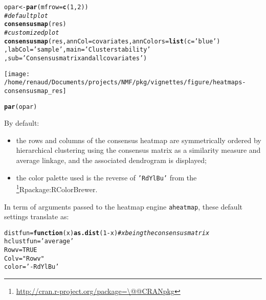 \documentclass[a4paper]{article}\usepackage[]{graphicx}\usepackage[]{color}
\makeatletter
\def\maxwidth{ %
  \ifdim\Gin@nat@width>\linewidth
    \linewidth
  \else
    \Gin@nat@width
  \fi
}
\newcommand{\hlnum}[1]{\textcolor[rgb]{0.686,0.059,0.569}{#1}}%
\newcommand{\hlstr}[1]{\textcolor[rgb]{0.192,0.494,0.8}{#1}}%
\newcommand{\hlcom}[1]{\textcolor[rgb]{0.678,0.584,0.686}{\textit{#1}}}%
\newcommand{\hlopt}[1]{\textcolor[rgb]{0,0,0}{#1}}%
\newcommand{\hlstd}[1]{\textcolor[rgb]{0.345,0.345,0.345}{#1}}%
\newcommand{\hlkwa}[1]{\textcolor[rgb]{0.161,0.373,0.58}{\textbf{#1}}}%
\newcommand{\hlkwb}[1]{\textcolor[rgb]{0.69,0.353,0.396}{#1}}%
\newcommand{\hlkwc}[1]{\textcolor[rgb]{0.333,0.667,0.333}{#1}}%
\newcommand{\hlkwd}[1]{\textcolor[rgb]{0.737,0.353,0.396}{\textbf{#1}}}%
\newenvironment{kframe}{%
 \def\at@end@of@kframe{}%
 \ifinner\ifhmode%
  \def\at@end@of@kframe{\end{minipage}}%
  \begin{minipage}{\columnwidth}%
 \fi\fi%
 \def\FrameCommand##1{\hskip\@totalleftmargin \hskip-\fboxsep
 \colorbox{shadecolor}{##1}\hskip-\fboxsep
     \hskip-\linewidth \hskip-\@totalleftmargin \hskip\columnwidth}%
 \MakeFramed {\advance\hsize-\width
   \@totalleftmargin\z@ \linewidth\hsize
   \@setminipage}}%
 {\par\unskip\endMakeFramed%
 \at@end@of@kframe}
\newenvironment{knitrout}{}{} %
\let\code=\texttt
\newcommand{\pkgname}[1]{\textit{#1}\xspace}
\newcommand{\CRANurl}[1]{\url{http://cran.r-project.org/package=#1}}
\def\CRANpkg{\@ifstar\@CRANpkg\@@CRANpkg}
\def\@CRANpkg#1{\href{http://cran.r-project.org/package=#1}{\pkgname{#1}}\footnote{\CRANurl{#1}}}
\def\@@CRANpkg#1{\href{http://cran.r-project.org/package=#1}{\pkgname{#1}} package\footnote{\CRANurl{#1}}}
\def\citeCRANpkg{\@ifstar\@citeCRANpkg\@@citeCRANpkg}
\def\@citeCRANpkg#1{\CRANpkg{#1}\cite*{Rpackage:#1}}
\def\@@citeCRANpkg#1{\CRANpkg{#1}~\cite{Rpackage:#1}}
\renewcommand{\cite}[1]{\parencite{#1}}
\makeatother
\begin{document}
\begin{knitrout}
\color{fgcolor}\begin{kframe}
\begin{alltt}
\hlstd{opar} \hlkwb{<-} \hlkwd{par}\hlstd{(}\hlkwc{mfrow}\hlstd{=}\hlkwd{c}\hlstd{(}\hlnum{1}\hlstd{,}\hlnum{2}\hlstd{))}
\hlcom{# default plot}
\hlkwd{consensusmap}\hlstd{(res)}
\hlcom{# customized plot}
\hlkwd{consensusmap}\hlstd{(res,} \hlkwc{annCol}\hlstd{=covariates,} \hlkwc{annColors}\hlstd{=}\hlkwd{list}\hlstd{(}\hlkwc{c}\hlstd{=}\hlstr{'blue'}\hlstd{)}
                \hlstd{,} \hlkwc{labCol}\hlstd{=}\hlstr{'sample '}\hlstd{,} \hlkwc{main}\hlstd{=}\hlstr{'Cluster stability'}
                \hlstd{,} \hlkwc{sub}\hlstd{=}\hlstr{'Consensus matrix and all covariates'}\hlstd{)}
\end{alltt}
\end{kframe}
\texttt{[image: /home/renaud/Documents/projects/NMF/pkg/vignettes/figure/heatmaps-consensusmap\_res]} 
\begin{kframe}\begin{alltt}
\hlkwd{par}\hlstd{(opar)}
\end{alltt}
\end{kframe}
\end{knitrout}

By default:
\begin{itemize}
\item the rows and columns of the consensus heatmap are symmetrically 
ordered by hierarchical clustering using the consensus matrix as a similarity 
measure and average linkage, and the associated dendrogram is displayed;
\item the color palette used is the reverse of \code{'RdYlBu'} from the \citeCRANpkg{RColorBrewer}.
\end{itemize}

In term of arguments passed to the heatmap engine \code{aheatmap}, these default 
settings translate as:

\begin{knitrout}
\color{fgcolor}\begin{kframe}
\begin{alltt}
\hlstd{distfun} \hlkwb{=} \hlkwa{function}\hlstd{(}\hlkwc{x}\hlstd{)} \hlkwd{as.dist}\hlstd{(}\hlnum{1}\hlopt{-}\hlstd{x)} \hlcom{# x being the consensus matrix}
\hlstd{hclustfun} \hlkwb{=} \hlstr{'average'}
\hlstd{Rowv} \hlkwb{=} \hlnum{TRUE}
\hlstd{Colv} \hlkwb{=} \hlstr{"Rowv"}
\hlstd{color} \hlkwb{=} \hlstr{'-RdYlBu'}
\end{alltt}
\end{kframe}
\end{knitrout}
\end{document}
